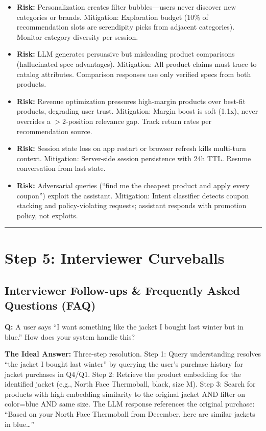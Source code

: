 \begin{itemize}
  \item \textbf{Risk:} Personalization creates filter bubbles---users never discover new categories or brands. Mitigation: Exploration budget (10\% of recommendation slots are serendipity picks from adjacent categories). Monitor category diversity per session.
  \item \textbf{Risk:} LLM generates persuasive but misleading product comparisons (hallucinated spec advantages). Mitigation: All product claims must trace to catalog attributes. Comparison responses use only verified specs from both products.
  \item \textbf{Risk:} Revenue optimization pressures high-margin products over best-fit products, degrading user trust. Mitigation: Margin boost is soft (1.1x), never overrides a $>$2-position relevance gap. Track return rates per recommendation source.
  \item \textbf{Risk:} Session state loss on app restart or browser refresh kills multi-turn context. Mitigation: Server-side session persistence with 24h TTL. Resume conversation from last state.
  \item \textbf{Risk:} Adversarial queries (``find me the cheapest product and apply every coupon'') exploit the assistant. Mitigation: Intent classifier detects coupon stacking and policy-violating requests; assistant responds with promotion policy, not exploits.
\end{itemize}

\bigskip\hrule\bigskip

\section*{Step 5: Interviewer Curveballs}

\subsection*{Interviewer Follow-ups \& Frequently Asked Questions (FAQ)}

\textbf{Q:} A user says ``I want something like the jacket I bought last winter but in blue.'' How does your system handle this?

\textbf{The Ideal Answer:} Three-step resolution. Step 1: Query understanding resolves ``the jacket I bought last winter'' by querying the user's purchase history for jacket purchases in Q4/Q1. Step 2: Retrieve the product embedding for the identified jacket (e.g., North Face Thermoball, black, size M). Step 3: Search for products with high embedding similarity to the original jacket AND filter on color=blue AND same size. The LLM response references the original purchase: ``Based on your North Face Thermoball from December, here are similar jackets in blue\ldots''

